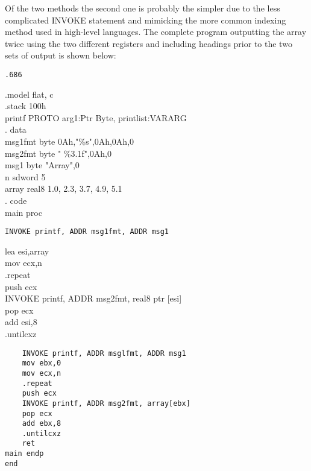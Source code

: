 \documentclass[10pt]{article}
\begin{document}
Of the two methods the second one is probably the simpler due to the less complicated INVOKE statement and mimicking the more common indexing method used in high-level languages. The complete program outputting the array twice using the two different registers and including headings prior to the two sets of output is shown below:

\begin{verbatim}
.686
\end{verbatim}

.model flat, c\\
.stack 100h\\
printf PROTO arg1:Ptr Byte, printlist:VARARG\\
. data\\
msg1fmt byte 0Ah,"\%s",0Ah,0Ah,0\\
msg2fmt byte " \%3.1f",0Ah,0\\
msg1 byte "Array",0\\
n sdword 5\\
array real8 1.0, 2.3, 3.7, 4.9, 5.1\\
. code\\
main proc

\begin{verbatim}
INVOKE printf, ADDR msg1fmt, ADDR msg1
\end{verbatim}

lea esi,array\\
mov ecx,n\\
.repeat\\
push ecx\\[0pt]
INVOKE printf, ADDR msg2fmt, real8 ptr [esi]\\
pop ecx\\
add esi,8\\
.untilcxz

\begin{verbatim}
    INVOKE printf, ADDR msglfmt, ADDR msg1
    mov ebx,0
    mov ecx,n
    .repeat
    push ecx
    INVOKE printf, ADDR msg2fmt, array[ebx]
    pop ecx
    add ebx,8
    .untilcxz
    ret
main endp
end
\end{verbatim}
\end{document}
